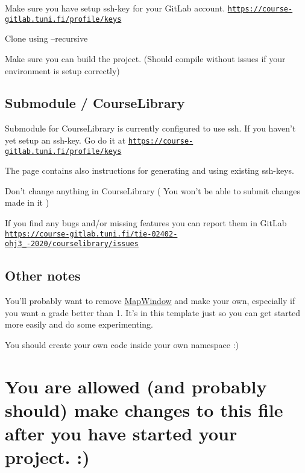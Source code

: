 
\begin{DoxyEnumerate}
\item Make sure you have setup ssh-\/key for your Git\-Lab account. \href{https://course-gitlab.tuni.fi/profile/keys}{\tt https\-://course-\/gitlab.\-tuni.\-fi/profile/keys}
\item Clone using --recursive
\item Make sure you can build the project. (Should compile without issues if your environment is setup correctly)
\end{DoxyEnumerate}

\subsection*{Submodule / Course\-Library}

Submodule for Course\-Library is currently configured to use ssh. If you haven't yet setup an ssh-\/key. Go do it at \href{https://course-gitlab.tuni.fi/profile/keys}{\tt https\-://course-\/gitlab.\-tuni.\-fi/profile/keys}

The page contains also instructions for generating and using existing ssh-\/keys.

Don't change anything in Course\-Library ( You won't be able to submit changes made in it )

If you find any bugs and/or missing features you can report them in Git\-Lab \href{https://course-gitlab.tuni.fi/tie-02402-ohj3_2019-2020/courselibrary/issues}{\tt https\-://course-\/gitlab.\-tuni.\-fi/tie-\/02402-\/ohj3\-\_-\/2020/courselibrary/issues}

\subsection*{Other notes}

You'll probably want to remove \hyperlink{classMapWindow}{Map\-Window} and make your own, especially if you want a grade better than 1. It's in this template just so you can get started more easily and do some experimenting.

You should create your own code inside your own namespace \-:)

\section*{You are allowed (and probably should) make changes to this file after you have started your project. \-:)}
